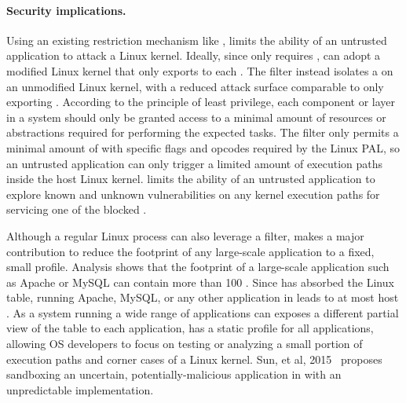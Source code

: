 

\paragraph{Security implications.}
Using an existing \linuxapi{} restriction mechanism like \seccomp{},
\graphene{} limits the ability of an untrusted application to attack a Linux kernel.
Ideally, since \thelibos{} only requires \thehostabi{},
\graphene{} can adopt a modified Linux kernel
that only exports \palcallnum{} \hostapis{} to each \picoproc{}.
The \seccomp{} filter instead isolates a \picoproc{} on an unmodified Linux kernel,
with a reduced attack surface 
comparable to only exporting \thehostabi{}.
According to the principle of least privilege,
each component or layer in a system should only be granted access to a minimal amount of resources or abstractions
required for performing the expected tasks.
The \seccomp{} filter only permits
a minimal amount of \linuxapis{} with specific flags and opcodes
required by the Linux PAL,
so an untrusted application
can only trigger
a limited amount of execution paths inside the host Linux kernel.
\graphene{} limits
the ability of an untrusted application to explore
known and unknown vulnerabilities
on any kernel execution paths for servicing one of the blocked \linuxapis{}.



Although a regular Linux process can also leverage a \seccomp{} filter,
\graphene{} makes a major contribution
to reduce the \linuxapi{} footprint of any large-scale application
to a fixed, small \linuxapi{} profile.
Analysis %
shows that the \linuxapi{}  footprint of a large-scale application such as Apache or MySQL can contain more than 100 \linuxapis{}.
Since \thelibos{} has absorbed the Linux \linuxapi{} table,
running Apache, MySQL, or any other application in \graphene{} leads to at most \hostsyscallnum{} host \linuxapis{}.
As a system
running a wide range of applications
can exposes a different partial view of the \linuxapi{} table to each application,
\graphene{}
has a static \linuxapi{} profile for all applications,
allowing OS developers to focus
on testing or analyzing a small portion of execution paths and corner cases
of a Linux kernel.
Sun, et al, 2015~\cite{sun15unpredictability}
proposes sandboxing an uncertain, potentially-malicious application
in \graphene{}
with an unpredictable \thelibos{} implementation.







